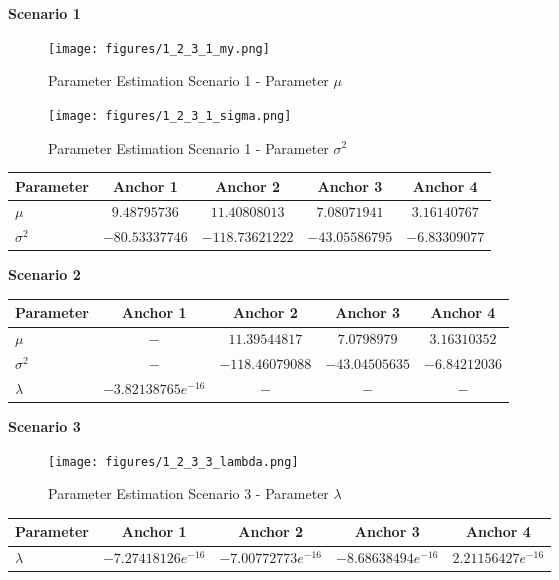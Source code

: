 \documentclass[12pt,a4paper]{article}
\begin{document}
\begin{enumerate}[1.]
\textbf{Scenario 1}

\begin{figure}[H]
  \centering
  \texttt{[image: figures/1\_2\_3\_1\_my.png]}
	\caption{Parameter Estimation Scenario 1 - Parameter $\mu$}
	\label{1_2_3_1_my}
\end{figure}

\begin{figure}[H]
  \centering
  \texttt{[image: figures/1\_2\_3\_1\_sigma.png]}
	\caption{Parameter Estimation Scenario 1 - Parameter $\sigma^2$}
	\label{1_2_3_1_sigma}
\end{figure}

\begin{tabular}{|l|c|c|c|c|} 
 \hline
 Parameter & Anchor 1 & Anchor 2 & Anchor 3 & Anchor 4\\\hline
 $\mu$ & $9.48795736$ & $11.40808013$ & $7.08071941$ & $3.16140767$ \\\hline
 $\sigma^2$ & $-80.53337746$ & $-118.73621222$ & $-43.05586795$ & $-6.83309077$
 \\\hline
\end{tabular}

\textbf{Scenario 2}

\begin{tabular}{|l|c|c|c|c|} 
 \hline
 Parameter & Anchor 1 & Anchor 2 & Anchor 3 & Anchor 4\\\hline
 $\mu$ & $-$ & $11.39544817$ & $7.0798979$ & $3.16310352$ \\\hline
 $\sigma^2$ & $-$ & $-118.46079088$ & $-43.04505635$ & $-6.84212036$
 \\\hline
 $\lambda$ & $-3.82138765e^{-16}$ & $-$ & $-$
 & $-$ \\\hline
\end{tabular}

\textbf{Scenario 3}

\begin{figure}[H]
  \centering
  \texttt{[image: figures/1\_2\_3\_3\_lambda.png]}
	\caption{Parameter Estimation Scenario 3 - Parameter $\lambda$}
	\label{1_2_3_3_lambda}
\end{figure}

\begin{tabular}{|l|c|c|c|c|} 
 \hline
 Parameter & Anchor 1 & Anchor 2 & Anchor 3 & Anchor 4\\\hline
 $\lambda$ & $-7.27418126e^{-16}$ & $-7.00772773e^{-16}$ & $-8.68638494e^{-16}$
 & $2.21156427e^{-16}$ \\\hline
\end{tabular}

\end{enumerate}
\end{document}
